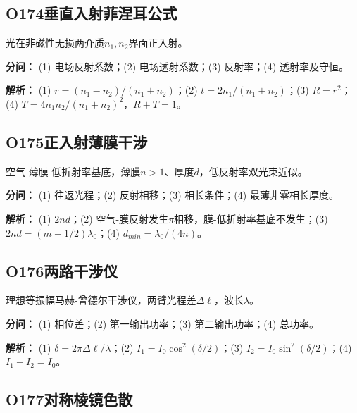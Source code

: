 \medskip

\subsection*{O174\quad 垂直入射菲涅耳公式}

光在非磁性无损两介质$n_1,n_2$界面正入射。

\par\textbf{分问：} (1) 电场反射系数；(2) 电场透射系数；(3) 反射率；(4) 透射率及守恒。

\par\textbf{解析：} (1) $r=(n_1-n_2)/(n_1+n_2)$；(2) $t=2n_1/(n_1+n_2)$；(3) $R=r^2$；(4) $T=4n_1n_2/(n_1+n_2)^2$，$R+T=1$。

\medskip

\subsection*{O175\quad 正入射薄膜干涉}

空气-薄膜-低折射率基底，薄膜$n>1$、厚度$d$，低反射率双光束近似。

\par\textbf{分问：} (1) 往返光程；(2) 反射相移；(3) 相长条件；(4) 最薄非零相长厚度。

\par\textbf{解析：} (1) $2nd$；(2) 空气-膜反射发生$\pi$相移，膜-低折射率基底不发生；(3) $2nd=(m+1/2)\lambda_0$；(4) $d_{min}=\lambda_0/(4n)$。

\medskip

\subsection*{O176\quad 两路干涉仪}

理想等振幅马赫-曾德尔干涉仪，两臂光程差$\Delta\ell$，波长$\lambda$。

\par\textbf{分问：} (1) 相位差；(2) 第一输出功率；(3) 第二输出功率；(4) 总功率。

\par\textbf{解析：} (1) $\delta=2\pi\Delta\ell/\lambda$；(2) $I_1=I_0\cos^2(\delta/2)$；(3) $I_2=I_0\sin^2(\delta/2)$；(4) $I_1+I_2=I_0$。

\medskip

\subsection*{O177\quad 对称棱镜色散}

